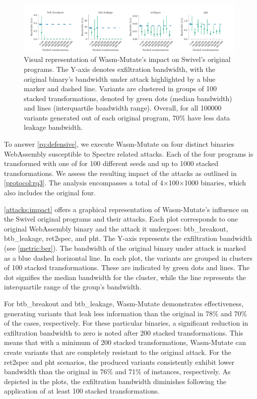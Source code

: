 \documentclass[a4paper,fleqn]{cas-dc}
\newcommand*\badge[1]{ \colorbox{red}{\color{white}#1}}
\newcommand{\tool}{{\sc Wasm-Mutate}\xspace}
\newcommand{\Wasm}{WebAssembly\xspace}
\newcommand{\wasm}{\Wasm}
\newcommand{\todo}[1]{%
\refstepcounter{todo}
\noindent\textbf{\badge{TODO}} {\color{red}#1}
\addcontentsline{td}{todo}
{\color{red}\thesection.\thetodo\xspace #1}}
\begin{document}
\begin{figure}
    \centering
    \includegraphics[width=\linewidth]{plots/rq3/results.rq3.pdf}
    \caption{Visual representation of \tool's impact on Swivel's original programs. The Y-axis denotes exfiltration bandwidth, with the original binary's bandwidth under attack highlighted by a blue marker and dashed line. Variants are clustered in groups of 100 stacked transformations, denoted by green dots (median bandwidth) and lines (interquartile bandwidth range). Overall, for all 100000 variants generated out of each original program, 70\% have less data leakage bandwidth.}
  \label{attacks:impact}
\end{figure}


To answer \ref{rq:defensive}, we execute \tool on four distinct binaries \wasm susceptible to Spectre related attacks. Each of the four programs is transformed with one of for 100 different seeds and up to 1000 stacked transformations. 
We assess the resulting impact of the attacks as outlined in \ref{protocol:rq3}. 
The  analysis encompasses a total of 4$\times$100$\times$1000 binaries, which also includes the original four.

\autoref{attacks:impact} offers a graphical representation of \tool's influence on the Swivel original programs and their attacks. 
Each plot corresponds to one original \wasm binary and the attack it undergoes: btb\_breakout, btb\_leakage, ret2spec, and pht.
The Y-axis represents the exfiltration bandwidth (see \autoref{metric:ber}). 
The bandwidth of the original binary under attack is marked as a blue dashed horizontal line.
In each plot, the variants are grouped in clusters of 100 stacked transformations. 
These are indicated by green dots and lines. 
The dot signifies the median bandwidth for the cluster, while the line represents the interquartile range of the group's bandwidth.



For btb\_breakout and btb\_leakage, \tool demonstrates effectiveness, generating variants that leak less information than the original in 78\% and 70\% of the cases, respectively.
For these particular binaries, a significant reduction in exfiltration bandwidth to zero is noted after 200 stacked transformations.
This means that with a minimum of 200 stacked transformations, \tool can create variants that are completely resistant to the original attack.
For the ret2spec and pht scenarios, the produced variants consistently exhibit lower bandwidth than the original in 76\% and 71\% of instances, respectively.
As depicted in the plots, the exfiltration bandwidth diminishes following the application of at least  100 stacked transformations.
\end{document}
